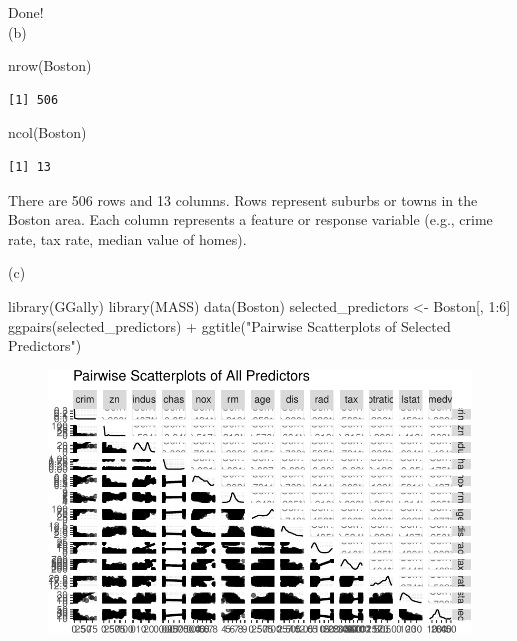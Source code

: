 \documentclass[
]{article}
\newenvironment{Shaded}{\begin{snugshade}}{\end{snugshade}}
\newcommand{\DecValTok}[1]{\textcolor[rgb]{0.68,0.00,0.00}{#1}}
\newcommand{\FunctionTok}[1]{\textcolor[rgb]{0.28,0.35,0.67}{#1}}
\newcommand{\NormalTok}[1]{\textcolor[rgb]{0.00,0.23,0.31}{#1}}
\newcommand{\OtherTok}[1]{\textcolor[rgb]{0.00,0.23,0.31}{#1}}
\newcommand{\SpecialCharTok}[1]{\textcolor[rgb]{0.37,0.37,0.37}{#1}}
\newcommand{\StringTok}[1]{\textcolor[rgb]{0.13,0.47,0.30}{#1}}
\begin{document}
Done!\\
(b)

\begin{Shaded}
\begin{Highlighting}[]
\FunctionTok{nrow}\NormalTok{(Boston)  }
\end{Highlighting}
\end{Shaded}

\begin{verbatim}
[1] 506
\end{verbatim}

\begin{Shaded}
\begin{Highlighting}[]
\FunctionTok{ncol}\NormalTok{(Boston)  }
\end{Highlighting}
\end{Shaded}

\begin{verbatim}
[1] 13
\end{verbatim}

There are 506 rows and 13 columns. Rows represent suburbs or towns in
the Boston area. Each column represents a feature or response variable
(e.g., crime rate, tax rate, median value of homes).

(c)

\begin{Shaded}
\begin{Highlighting}[]
\FunctionTok{library}\NormalTok{(GGally)}
\FunctionTok{library}\NormalTok{(MASS)}
\FunctionTok{data}\NormalTok{(Boston)}
\NormalTok{selected\_predictors }\OtherTok{\textless{}{-}}\NormalTok{ Boston[, }\DecValTok{1}\SpecialCharTok{:}\DecValTok{6}\NormalTok{]}
\FunctionTok{ggpairs}\NormalTok{(selected\_predictors) }\SpecialCharTok{+}
  \FunctionTok{ggtitle}\NormalTok{(}\StringTok{"Pairwise Scatterplots of Selected Predictors"}\NormalTok{)}
\end{Highlighting}
\end{Shaded}

\begin{figure}[H]

{\centering \includegraphics{hw1_files/figure-pdf/unnamed-chunk-7-1.pdf}

}

\end{figure}
\end{document}
